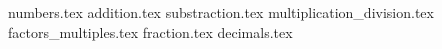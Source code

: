 \documentclass[a4paper,12pt, openany]{exam}
\begin{document}
     {numbers.tex} \newpage
     {addition.tex} \newpage
     {substraction.tex} \newpage
     {multiplication_division.tex} \newpage
     {factors_multiples.tex} \newpage
     {fraction.tex} \newpage
     {decimals.tex}
\end{document}
